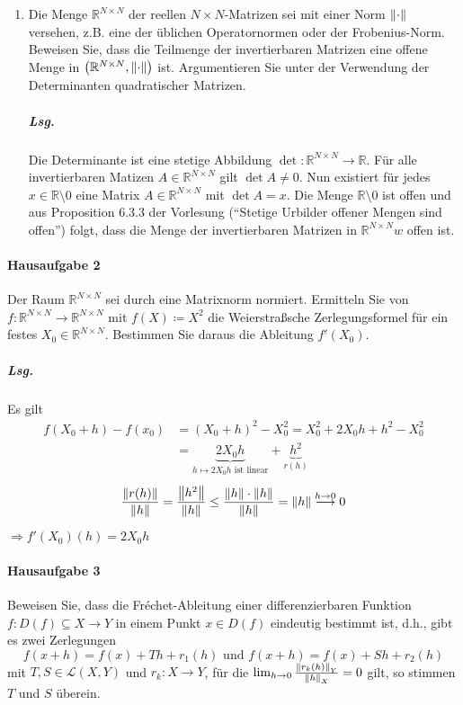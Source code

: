 \documentclass{scrreprt}
\begin{document}
\begin{enumerate}[1)]
\item Die Menge $\mathbb{R}^{N \times N}$ der reellen $N \times N$-Matrizen sei
  mit einer Norm $\norm{\cdot}$ versehen, z.B. eine der üblichen Operatornormen
  oder der Frobenius-Norm.
  Beweisen Sie, dass die Teilmenge der invertierbaren Matrizen eine offene Menge
  in $\qty(\mathbb{R}^{N \times N}, \norm{\cdot})$ ist.
  Argumentieren Sie unter der Verwendung der Determinanten quadratischer
  Matrizen.

  \subparagraph{Lsg.} Die Determinante ist eine stetige Abbildung
  $\det \colon \mathbb{R}^{N \times N} \to \mathbb{R}$.
  Für alle invertierbaren Matizen $A \in \mathbb{R}^{N \times N}$
  gilt $\det A \ne 0$.
  Nun existiert für jedes $x \in \mathbb{R} \setminus \qty{0}$
  eine Matrix $A \in \mathbb{R}^{N \times N}$ mit
  $\det A = x$.
  Die Menge $\mathbb{R} \setminus \qty{0}$ ist offen und aus
  Proposition 6.3.3 der Vorlesung
  (``Stetige Urbilder offener Mengen sind offen'')
  folgt, dass die Menge der invertierbaren Matrizen in
  $\mathbb{R}^{N \times N}w$ offen ist.
\end{enumerate}

\paragraph{Hausaufgabe 2} Der Raum $\mathbb{R}^{N \times N}$ sei durch eine
Matrixnorm normiert.
Ermitteln Sie von $f \colon \mathbb{R}^{N \times N} \to \mathbb{R}^{N \times N}$
mit $f(X) \coloneqq X^2$ die Weierstraßsche Zerlegungsformel für ein festes
$X_0 \in \mathbb{R}^{N \times N}$.
Bestimmen Sie daraus die Ableitung $f'(X_0)$.

\subparagraph{Lsg.}

Es gilt
\begin{align*}
  f(X_0 + h) - f(x_0) &= (X_0 + h)^2 - X_0^2 = X_0^2 + 2X_0h + h^2 - X_0^2 \\
                      &= \underset{h \mapsto 2X_0h \text{ ist linear}}{\underbrace{2X_0h}} +
                        \underset{r(h)}{\underbrace{h^2}}
\end{align*}
\[
  \frac{\norm{r(h)}}{\norm{h}} = \frac{\norm{h^2}}{\norm{h}}
  \leq \frac{\norm{h} \cdot \norm{h}}{\norm{h}} = \norm{h}
  \overset{h \to 0}\longrightarrow 0
\]

$\Rightarrow f'(X_0)(h) = 2X_0h$


\paragraph{Hausaufgabe 3} Beweisen Sie, dass die Fréchet-Ableitung einer
differenzierbaren Funktion $f \colon D(f) \subseteq X \to Y$
in einem Punkt $x \in D(f)$ eindeutig bestimmt ist, d.h., gibt es zwei
Zerlegungen
\[
  f(x + h) = f(x) + Th + r_1(h) \text{ und } f(x + h) = f(x) + Sh + r_2(h)
\]
mit $T, S \in \mathcal{L}(X, Y)$ und $r_k \colon X \to Y$, für die
$\lim_{h \to 0} \frac{\norm{r_k(h)}_Y}{\norm{h}_X} = 0$ gilt, so stimmen
$T$ und $S$ überein.
\end{document}
